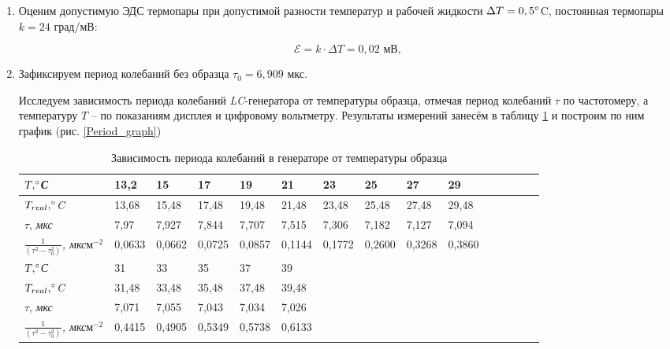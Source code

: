 \documentclass[a4paper, 12pt]{article}
\begin{document}
\begin{enumerate}

\item Оценим допустимую ЭДС термопары при допустимой разности температур и рабочей жидкости $\Delta T = 0,5\degree$C, постоянная термопары $k = 24$ град/мВ:

\[\mathscr{E} = k \cdot \Delta T = 0,02 \text{ мВ},\]

\item Зафиксируем период колебаний без образца $\tau_0 = 6,909$ мкс.

Исследуем зависимость периода колебаний \textit{LC}-генератора от температуры образца, отмечая период колебаний $\tau$ по частотомеру, а температуру $T$ -- по показаниям дисплея и цифровому вольтметру. Результаты измерений занесём в таблицу \ref{Period_table} и построим по ним график (рис. \ref{Period_graph})

\begin{table}[h]
\caption{Зависимость периода колебаний в генераторе от температуры образца}
\small
\begin{tabular}{|l|l|l|l|l|l|l|l|l|l|l|l|l|l|l|}
\hline
$T, \degree$\textit{С}                       & 13,2   & 15     & 17     & 19     & 21     & 23     & 25     & 27     & 29     \\ \hline
$T_{real}, \degree$\textit{C}                  & 13,68  & 15,48  & 17,48  & 19,48  & 21,48  & 23,48  & 25,48  & 27,48  & 29,48  \\ \hline
$\tau$, \textit{мкс}                     & 7,97   & 7,927  & 7,844  & 7,707  & 7,515  & 7,306  & 7,182  & 7,127  & 7,094  \\ \hline
\textit{$\frac{1}{(\tau^2-\tau_0^2)}$, мкс$м^{-2}$} & 0,0633 & 0,0662 & 0,0725 & 0,0857 & 0,1144 & 0,1772 & 0,2600 & 0,3268 & 0,3860 \\ \hline
\hline
$T, \degree$\textit{С}                                                              & 31     & 33     & 35     & 37     & 39    & & & &\\ \hline
$T_{real}, \degree$\textit{C}                                    & 31,48  & 33,48  & 35,48  & 37,48  & 39,48 & & & & \\ \hline
$\tau$, \textit{мкс}                                      & 7,071  & 7,055  & 7,043  & 7,034  & 7,026 & & & &\\ \hline
\textit{$\frac{1}{(\tau^2-\tau_0^2)}$, мкс$м^{-2}$} & 0,4415 & 0,4905 & 0,5349 & 0,5738 & 0,6133 & & & &\\ \hline

\end{tabular}
\label{Period_table}
\end{table}


\end{enumerate}
\end{document}
